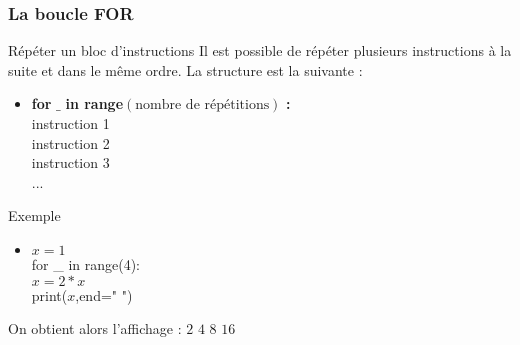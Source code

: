 \documentclass[8pt]{beamer}
\begin{document}
\begin{frame}
\frametitle{La boucle FOR}

\begin{block}{Répéter un bloc d'instructions}
Il est possible de répéter plusieurs instructions à la suite et dans le même ordre. La structure est la suivante :
\begin{itemize}
\item \textbf{for} $\_$ \textbf{in range}$(\text{nombre de répétitions})$ \textbf{:}\\
\hspace{0.5cm} instruction 1\\
\hspace{0.5cm} instruction 2\\
\hspace{0.5cm} instruction 3 \\ ...
\end{itemize}
\end{block}

\begin{exampleblock}{Exemple}
\begin{itemize}
\item $x=1$\\
for \_ in range(4):\\
\hspace{0.5cm}$x=2*x$\\
\hspace{0.5cm}print($x$,end=" ")
\end{itemize}
On obtient alors l'affichage : $2$ $4$ $8$ $16$
\end{exampleblock}

\end{frame}
\end{document}
